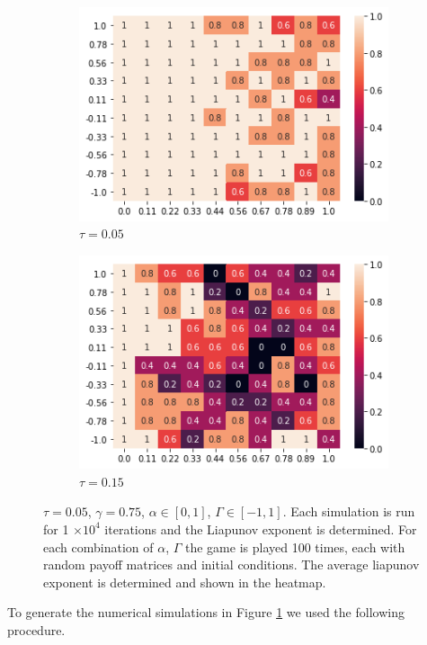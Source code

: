 \documentclass[letterpaper]{article} %
\begin{document}
\begin{figure}[h]
    \centering
     \begin{subfigure}[b]{0.45 \textwidth}
    \centering
    \includegraphics[width = 0.7 \textwidth]{Figures/AlphaRun_tau_005.png}
    \caption{$\tau = 0.05$}
    \end{subfigure}
    \begin{subfigure}[b]{0.45 \textwidth}
    \centering
    \includegraphics[width = 0.7 \textwidth]{Figures/tau_015.png}
    \caption{$\tau = 0.15$}
    \end{subfigure}

    \caption{$\tau = 0.05$, $\gamma = 0.75$, $\alpha \in [0, 1]$, $\Gamma \in [-1, 1]$. Each
    simulation is run for 1 $\times 10^4$ iterations and the Liapunov exponent is determined. For each
    combination of $\alpha$, $\Gamma$ the game is played 100 times, each with random payoff matrices
    and initial conditions. The average liapunov exponent is determined and shown in the heatmap.
    \label{fig::NumericalExperiments}}
\end{figure}

   To generate the numerical simulations in Figure \ref{fig::NumericalExperiments} we used the
   following procedure.
\end{document}
